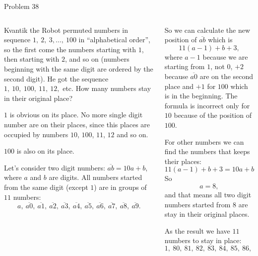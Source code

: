 \documentclass[9pt,aspectratio=169]{beamer}
\begin{document}
\begin{frame}{Problem 38}
  \begin{columns}[T]
    \begin{column}{0.5\textwidth}
      \begin{problem}
        Kvantik the Robot permuted numbers in sequence $1,\ 2,\ 3, \ldots,\ 100$ in “alphabetical order”, so the first come the numbers starting with $1$, then starting with $2$, and so on (numbers beginning with the same digit are ordered by the second digit). He got the sequence $1,\ 10,\ 100,\ 11,\ 12,$ etc. How many numbers stay in their original place?
      \end{problem}

      $1$ is obvious on its place. No more single digit number are on their places, since this places are occupied by numbers $10$, $100$, $11$, $12$ and so on.

      $100$ is also on its place.

      Let's consider two digit numbers: $\overline{ab} = 10a + b$, where $a$ and $b$ are digits.
      All numbers started from the same digit (except $1$) are in groups of $11$ numbers: 
      \[a,\ \overline{a0},\ \overline{a1},\ \overline{a2},\ \overline{a3},\ \overline{a4},\ \overline{a5},\ \overline{a6},\ \overline{a7},\ \overline{a8},\ \overline{a9}.\]
    \end{column}
    \begin{column}{0.5\textwidth}
      So we can calculate the new position of $\overline{ab}$ which is \[ 11(a-1) + b + 3, \]
      where $a-1$ because we are starting from $1$, not $0$, $+2$ because $\overline{a0}$ are on the second place and $+1$ for $100$ which is in the beginning. The formula is incorrect only for $10$ because of the position of $100$.

      For other numbers we can find the numbers that keeps their places:
      \[ 11 (a-1) + b + 3 = 10a + b. \]
      So 
      \[ a = 8, \]
      and that means all two digit numbers started from $8$ are stay in their original places.

      As the result we have $11$ numbers to stay in place:
      \[ 1,\ 80,\ 81,\ 82,\ 83,\ 84,\ 85,\ 86,\ 87,\ 88,\ 89. \]
    \end{column}
  \end{columns}
\end{frame}
\end{document}
